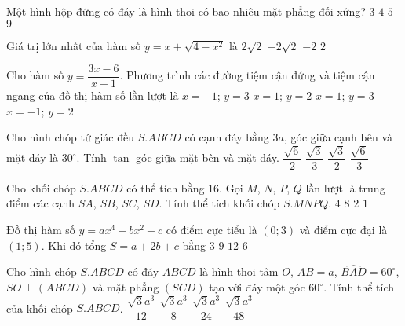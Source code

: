 \begin{ex}%
Một hình hộp đứng có đáy là hình thoi có bao nhiêu mặt phẳng đối xứng?
\choice
{\True $3$}
{$4$}
{$5$}
{$9$}
\end{ex}
\begin{ex}%
Giá trị lớn nhất của hàm số $y=x+\sqrt{4-x^{2}}$ là
\choice
{\True $2\sqrt{2}$}
{$-2\sqrt{2}$}
{$-2$}
{$2$}
\end{ex}
\begin{ex}%
Cho hàm số $y=\dfrac{3x-6}{x+1}$. Phương trình các đường tiệm cận đứng và tiệm cận ngang của đồ thị hàm số lần lượt là
\choice
{\True $x=-1$; $y=3$}
{$x=1$; $y=2$}
{$x=1$; $y=3$}
{$x=-1$; $y=2$}
\end{ex}
\begin{ex}%
Cho hình chóp tứ giác đều $S.ABCD$ có cạnh đáy bằng $3a$, góc giữa cạnh bên và mặt đáy là $30^{\circ}$. Tính $\tan$ góc giữa mặt bên và mặt đáy.
\choice
{$\dfrac{\sqrt{6}}{2}$}
{$\dfrac{\sqrt{3}}{3}$}
{$\dfrac{\sqrt{3}}{2}$}
{\True $\dfrac{\sqrt{6}}{3}$}
\end{ex}
\begin{ex}%
Cho khối chóp $S.ABCD$ có thể tích bằng $16$. Gọi $M$, $N$, $P$, $Q$ lần lượt là trung điểm các cạnh $SA$, $SB$, $SC$, $SD$. Tính thể tích khối chóp $S.MNPQ$.
\choice
{$4$}
{$8$}
{\True $2$}
{$1$}
\end{ex}
\begin{ex}%
Đồ thị hàm số $y=ax^{4}+bx^{2}+c$ có điểm cực tiểu là $(0;3)$ và điểm cực đại là $(1;5)$. Khi đó tổng $S=a+2b+c$ bằng
\choice
{$3$}
{\True $9$}
{$12$}
{$6$}
\end{ex}
\begin{ex}%
{
\hspace*{0.5cm}
}
\end{ex}
\begin{ex}%
Cho hình chóp $S.ABCD$ có đáy $ABCD$ là hình thoi tâm $O$, $AB=a$, $\widehat{BAD}=60^{\circ}$, $SO\perp (ABCD)$ và mặt phẳng $(SCD)$ tạo với đáy một góc $60^{\circ}$. Tính thể tích của khối chóp $S.ABCD$.
\choice
{$\dfrac{\sqrt{3}a^{3}}{12}$}
{\True $\dfrac{\sqrt{3}a^{3}}{8}$}
{$\dfrac{\sqrt{3}a^{3}}{24}$}
{$\dfrac{\sqrt{3}a^{3}}{48}$}
\end{ex}
